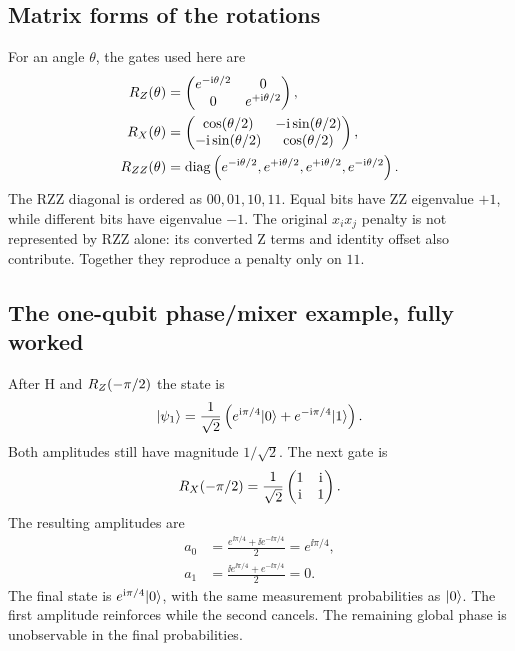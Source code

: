 \subsection{Matrix forms of the rotations}
For an angle $\theta$, the gates used here are
\begin{align}
R_{Z}(\theta)&=
\begin{pmatrix}e^{-\mathrm{i}\theta/2}&0\\0&e^{+\mathrm{i}\theta/2}\end{pmatrix},\\
R_{X}(\theta)&=
\begin{pmatrix}
\cos(\theta/2)&-\mathrm{i}\sin(\theta/2)\\
-\mathrm{i}\sin(\theta/2)&\cos(\theta/2)
\end{pmatrix},\\
R_{ZZ}(\theta)&=\operatorname{diag}
\left(e^{-\mathrm{i}\theta/2},e^{+\mathrm{i}\theta/2},e^{+\mathrm{i}\theta/2},e^{-\mathrm{i}\theta/2}\right).
\end{align}
The RZZ diagonal is ordered as $00,01,10,11$. Equal bits have ZZ eigenvalue
$+1$, while different bits have eigenvalue $-1$. The original $x_i x_j$
penalty is not represented by RZZ alone: its converted Z terms and identity
offset also contribute. Together they reproduce a penalty only on $11$.

\subsection{The one-qubit phase/mixer example, fully worked}
After H and $R_{Z}(-\pi/2)$ the state is
\begin{equation}
\lvert \psi_1\rangle=\frac1{\sqrt2}
\left(e^{\mathrm{i}\pi/4}\lvert 0\rangle+e^{-\mathrm{i}\pi/4}\lvert 1\rangle\right).
\end{equation}
Both amplitudes still have magnitude $1/\sqrt2$. The next gate is
\begin{equation}
R_{X}(-\pi/2)=\frac1{\sqrt2}
\begin{pmatrix}1&\mathrm{i}\\\mathrm{i}&1\end{pmatrix}.
\end{equation}
The resulting amplitudes are
\begin{align}
a_0&=\frac{e^{\ii\pi/4}+\ii e^{-\ii\pi/4}}2=e^{\ii\pi/4},\\
a_1&=\frac{\ii e^{\ii\pi/4}+e^{-\ii\pi/4}}2=0.
\end{align}
The final state is $e^{\mathrm{i}\pi/4}\lvert 0\rangle$, with the same measurement probabilities
as $\lvert 0\rangle$. The first amplitude reinforces while the second cancels. The
remaining global phase is unobservable in the final probabilities.

